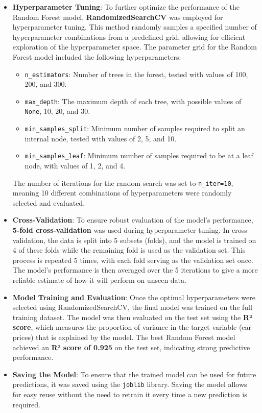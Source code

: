 \documentclass[a4paper,12pt]{article}
\begin{document}
\begin{justify}
\begin{itemize}
		\item \textbf{Hyperparameter Tuning}: To further optimize the performance of the Random Forest model, \textbf{RandomizedSearchCV} was employed for hyperparameter tuning. This method randomly samples a specified number of hyperparameter combinations from a predefined grid, allowing for efficient exploration of the hyperparameter space. The parameter grid for the Random Forest model included the following hyperparameters:
		\begin{itemize}
			\item \texttt{n\_estimators}: Number of trees in the forest, tested with values of 100, 200, and 300.
			\item \texttt{max\_depth}: The maximum depth of each tree, with possible values of \texttt{None}, 10, 20, and 30.
			\item \texttt{min\_samples\_split}: Minimum number of samples required to split an internal node, tested with values of 2, 5, and 10.
			\item \texttt{min\_samples\_leaf}: Minimum number of samples required to be at a leaf node, with values of 1, 2, and 4.
		\end{itemize}
		The number of iterations for the random search was set to \texttt{n\_iter=10}, meaning 10 different combinations of hyperparameters were randomly selected and evaluated.
		
		\item \textbf{Cross-Validation}: To ensure robust evaluation of the model's performance, \textbf{5-fold cross-validation} was used during hyperparameter tuning. In cross-validation, the data is split into 5 subsets (folds), and the model is trained on 4 of these folds while the remaining fold is used as the validation set. This process is repeated 5 times, with each fold serving as the validation set once. The model's performance is then averaged over the 5 iterations to give a more reliable estimate of how it will perform on unseen data.
		
		\item \textbf{Model Training and Evaluation}: Once the optimal hyperparameters were selected using RandomizedSearchCV, the final model was trained on the full training dataset. The model was then evaluated on the test set using the \textbf{R² score}, which measures the proportion of variance in the target variable (car prices) that is explained by the model. The best Random Forest model achieved an \textbf{R² score of 0.925} on the test set, indicating strong predictive performance.
		
		\item \textbf{Saving the Model}: To ensure that the trained model can be used for future predictions, it was saved using the \texttt{joblib} library. Saving the model allows for easy reuse without the need to retrain it every time a new prediction is required.
		
	\end{itemize}
	
\end{justify}
\end{document}
